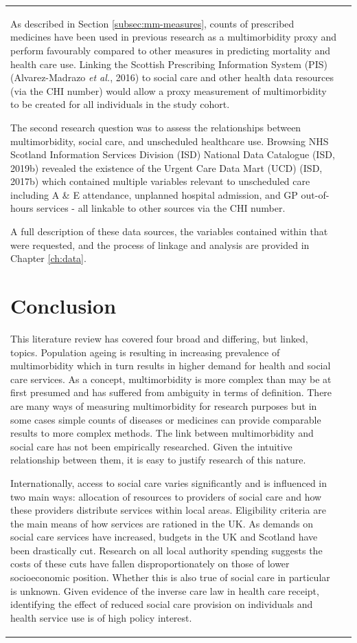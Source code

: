 \documentclass[12pt,a4paper,oneside,table]{report}
\begin{document}
\begin{tabular}[t]{ll}
As described in Section \ref{subsec:mm-measures}, counts of prescribed
medicines have been used in previous research as a multimorbidity proxy
and perform favourably compared to other measures in predicting
mortality and health care use. Linking the Scottish Prescribing
Information System (PIS) (Alvarez-Madrazo \emph{et al.}, 2016) to social
care and other health data resources (via the CHI number) would allow a
proxy measurement of multimorbidity to be created for all individuals in
the study cohort.

The second research question was to assess the relationships between
multimorbidity, social care, and unscheduled healthcare use. Browsing
NHS Scotland Information Services Division (ISD) National Data Catalogue
(ISD, 2019b) revealed the existence of the Urgent Care Data Mart (UCD)
(ISD, 2017b) which contained multiple variables relevant to unscheduled
care including A \& E attendance, unplanned hospital admission, and GP
out-of-hours services - all linkable to other sources via the CHI
number.

A full description of these data sources, the variables contained within
that were requested, and the process of linkage and analysis are
provided in Chapter \ref{ch:data}.

\newpage
\section{Conclusion}\label{sec:lit-review-conclusion}

This literature review has covered four broad and differing, but linked,
topics. Population ageing is resulting in increasing prevalence of
multimorbidity which in turn results in higher demand for health and
social care services. As a concept, multimorbidity is more complex than
may be at first presumed and has suffered from ambiguity in terms of
definition. There are many ways of measuring multimorbidity for research
purposes but in some cases simple counts of diseases or medicines can
provide comparable results to more complex methods. The link between
multimorbidity and social care has not been empirically researched.
Given the intuitive relationship between them, it is easy to justify
research of this nature.

Internationally, access to social care varies significantly and is
influenced in two main ways: allocation of resources to providers of
social care and how these providers distribute services within local
areas. Eligibility criteria are the main means of how services are
rationed in the UK. As demands on social care services have increased,
budgets in the UK and Scotland have been drastically cut. Research on
all local authority spending suggests the costs of these cuts have
fallen disproportionately on those of lower socioeconomic position.
Whether this is also true of social care in particular is unknown. Given
evidence of the inverse care law in health care receipt, identifying the
effect of reduced social care provision on individuals and health
service use is of high policy interest.


\end{tabular}
\end{document}
